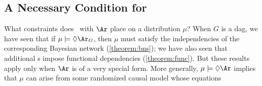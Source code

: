 \subsection{A Necessary Condition for \SCibility}
    \label{sec:sc-infobound}
What constraints does \scibility\ with $\Ar$ place on a distribution $\mu$?
When $G$ is a dag, we have seen that if $\mu \models \Diamond \Ar_G$, then $\mu$ must satisfy the independencies of the corresponding Bayesian network (\cref{theorem:bns}); we have also seen that additional \arc s impose functional dependencies (\cref{theorem:func}). But these
results apply only when $\Ar$ is of a very special form.  
%
More generally, $\mu \models \Diamond \Ar$ implies that $\mu$ can arise from some 
randomized causal model whose equations
